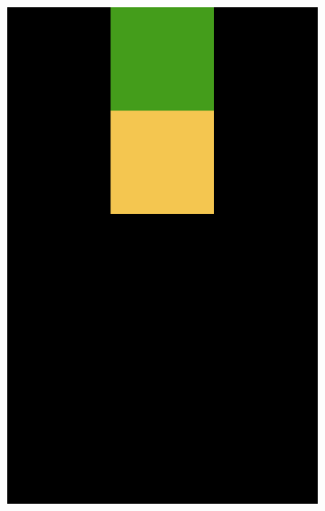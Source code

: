 \begin{figure}[ht]
\begin{subfigure}{0.2\textwidth}
        \label{fig:TestConflict1}
    \end{subfigure}
    \hfill
    \begin{subfigure}{0.2\textwidth}
        \includegraphics[width=\textwidth]{TestConflict2.png}
        \label{fig:TestConflict2}
    \end{subfigure}
    \hfill
    \begin{subfigure}{0.2\textwidth}

\end{subfigure}
\end{figure}
